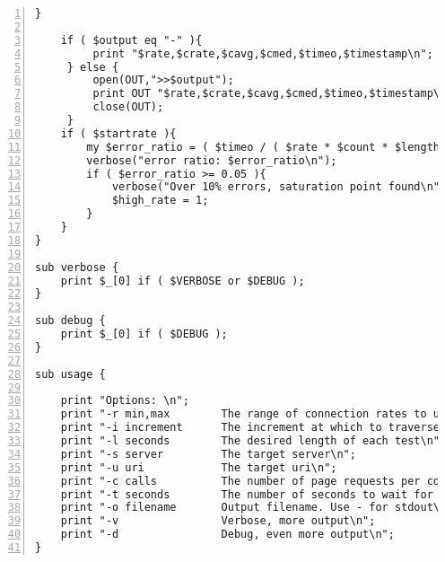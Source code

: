 \begin{Verbatim}[numbers=left,label=The hammer.pl script]
    }

    if ( $output eq "-" ){
         print "$rate,$crate,$cavg,$cmed,$timeo,$timestamp\n";
     } else {
         open(OUT,">>$output");
         print OUT "$rate,$crate,$cavg,$cmed,$timeo,$timestamp\n";
         close(OUT);
     }
    if ( $startrate ){
        my $error_ratio = ( $timeo / ( $rate * $count * $length ) );
        verbose("error ratio: $error_ratio\n");
        if ( $error_ratio >= 0.05 ){
            verbose("Over 10% errors, saturation point found\n");
            $high_rate = 1;
        }
    }
}

sub verbose {
    print $_[0] if ( $VERBOSE or $DEBUG );
}

sub debug {
    print $_[0] if ( $DEBUG );
}

sub usage {

    print "Options: \n";
    print "-r min,max        The range of connection rates to use\n";
    print "-i increment      The increment at which to traverse the range\n";
    print "-l seconds        The desired length of each test\n";
    print "-s server         The target server\n";
    print "-u uri            The target uri\n";
    print "-c calls          The number of page requests per connection\n";
    print "-t seconds        The number of seconds to wait for a response\n";
    print "-o filename       Output filename. Use - for stdout\n";
    print "-v                Verbose, more output\n";
    print "-d                Debug, even more output\n";
}	
\end{Verbatim}
